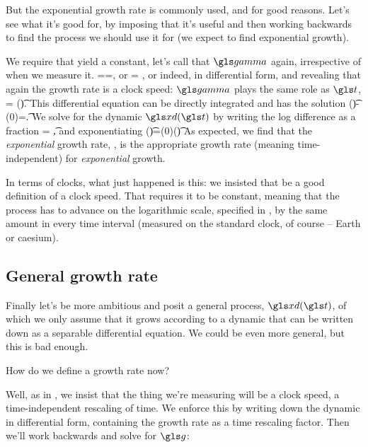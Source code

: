 But the exponential growth rate is commonly used, and for good reasons. Let's see what it's 
good for, by imposing that it's useful and then working backwards to find the process we 
should use it for (we expect to find exponential growth).

We require that  yield a constant, let's call that $\ggamma$ again, irrespective 
of when we measure it.
\be
 \gexp=\frac{\D \ln \xd}{\Dt}=\ggamma,
\ee
or
\be
\D \ln \xd = \ggamma\Dt,
\ee
or indeed, in differential form, and revealing that again the growth rate is a clock speed: 
$\ggamma$ plays the same role as $\t$,
\be
\gd\ln \xd = \gd(\ggamma \t).
\ee
This differential equation can be directly integrated and has the solution
\be
\ln \xd(\t)- \ln \xd(0)=\ggamma \t.
\ee
We solve for the dynamic $\xd(\t)$ by writing the log difference as a fraction
\be
\ln {} = \ggamma \t ,
\ee
and exponentiating
\be
\xd(\t)=\xd(0)\exp(\ggamma \t)
\ee
As expected, we find that the {\it exponential} growth rate, , is the appropriate 
growth rate (meaning time-independent) for {\it exponential} growth.

In terms of clocks, what just happened is this: we insisted that  be a good 
definition of a clock speed. That requires it to be constant, meaning that the process has 
to advance on the logarithmic scale, specified in , by the same amount in 
every time interval (measured on the standard clock, of course -- Earth or caesium).

\subsection{General growth rate}

Finally let's be more ambitious and posit a general process, $\xd(\t)$, of which we only assume that it grows according to a dynamic that can be written down as a separable differential equation. We could be even more general, but this is bad enough.

How do we define a growth rate now?

Well, as in , we insist that the thing we're measuring will be a clock speed, \ie a 
time-independent rescaling of time. We enforce this by writing down the dynamic in differential 
form, containing the growth rate as a time rescaling factor. Then we'll work backwards and solve 
for $\g$:


